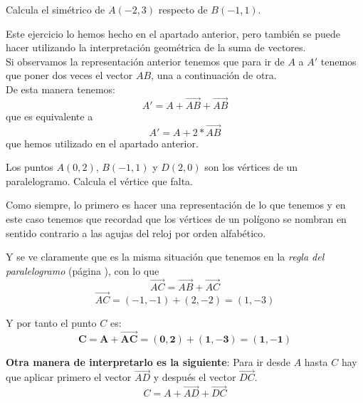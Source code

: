 \documentclass[a4paper,11pt,answers]{exam}
\begin{document}
\begin{questions}
\question Calcula el simétrico de $A(-2, 3)$ respecto de $B(-1,1)$.
  \begin{solution}
    Este ejercicio lo hemos hecho en el apartado anterior, pero también se puede hacer utilizando
    la interpretación geométrica de la suma de vectores.\\

    Si observamos la representación anterior tenemos que para ir de $A$ a $A'$ tenemos que
    poner dos veces el vector $AB$, una a continuación de otra.\\
    De esta manera tenemos:
    \[A' = A + \overrightarrow{AB} + \overrightarrow{AB}\]
    que es equivalente a
    \[A' = A + 2*\overrightarrow{AB}\]
    que hemos utilizado en el apartado anterior.
  \end{solution}
\question Los puntos $A(0,2)$, $B(-1,1)$ y $D(2, 0)$ son los vértices de un paralelogramo. Calcula
  el vértice que falta.
  \begin{solution}
    Como siempre, lo primero es hacer una representación de lo que tenemos y en este caso tenemos
    que recordad que los vértices de un polígono se nombran en sentido contrario a las agujas del
    reloj por orden alfabético.
    \begin{center}
    \end{center}
    Y se ve claramente que es la misma situación que tenemos en la \emph{regla del paralelogramo}
    (página \pageref{regla_paralelogramo}), con lo que
    \[\overrightarrow{AC} = \overrightarrow{AB} + \overrightarrow{AC}\]
    \[\overrightarrow{AC} = (-1,-1) + (2, -2) = (1, -3)\]
    
    Y por tanto el punto $C$ es:
    \[\boldsymbol{C = A + \overrightarrow{AC} = (0,2) + (1, -3) = (1,-1)}\]

    \vspace{1cm}\textbf{Otra manera de interpretarlo es la siguiente}:
    Para ir desde $A$ hasta $C$ hay que aplicar primero el vector $\overrightarrow{AD}$ y
    después el vector $\overrightarrow{DC}$.
    \[C = A + \overrightarrow{AD} + \overrightarrow{DC}\]
      

\end{solution}
\end{questions}
\end{document}
